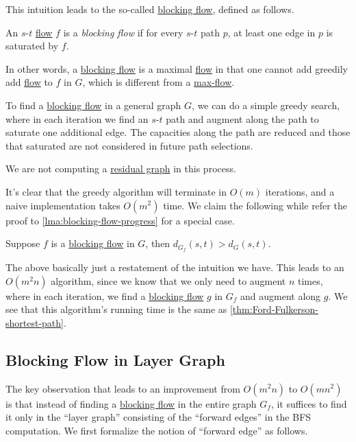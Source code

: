 This intuition leads to the so-called \hyperref[def:blocking-flow]{blocking flow}, defined as follows.

\begin{definition}\label{def:blocking-flow}
	An \(s\)-\(t\) \hyperref[def:flow]{flow} \(f\) is a \emph{blocking flow} if for every \(s\)-\(t\) path \(p\), at least one edge in \(p\) is saturated by \(f\).
\end{definition}

\begin{note}
	In other words, a \hyperref[def:blocking-flow]{blocking flow} is a maximal \hyperref[def:flow]{flow} in that one cannot add greedily add \hyperref[def:flow]{flow} to \(f\) in \(G\), which is different from a \hyperref[prb:s-t-max-flow]{max-flow}.
\end{note}

To find a \hyperref[def:blocking-flow]{blocking flow} in a general graph \(G\), we can do a simple greedy search, where in each iteration we find an \(s\)-\(t\) path and augment along the path to saturate one additional edge. The capacities along the path are reduced and those that saturated are not considered in future path selections.

\begin{note}
	We are not computing a \hyperref[def:residual-graph]{residual graph} in this process.
\end{note}

It's clear that the greedy algorithm will terminate in \(O(m)\) iterations, and a naive implementation takes \(O(m^2)\) time. We claim the following while refer the proof to \autoref{lma:blocking-flow-progress} for a special case.

\begin{claim}
	Suppose \(f\) is a \hyperref[def:blocking-flow]{blocking flow} in \(G\), then \(d_{G_f}(s, t) > d_{G}(s, t)\).
\end{claim}

The above basically just a restatement of the intuition we have. This leads to an \(O(m^2 n)\) algorithm, since we know that we only need to augment \(n\) times, where in each iteration, we find a \hyperref[def:blocking-flow]{blocking flow} \(g\) in \(G_f\) and augment along \(g\). We see that this algorithm's running time is the same as \autoref{thm:Ford-Fulkerson-shortest-path}.

\subsection{Blocking Flow in Layer Graph}
The key observation that leads to an improvement from \(O(m^2 n)\) to \(O(mn^2)\) is that instead of finding a \hyperref[def:blocking-flow]{blocking flow} in the entire graph \(G_f\), it suffices to find it only in the ``layer graph'' consisting of the ``forward edges'' in the BFS computation. We first formalize the notion of ``forward edge'' as follows.

